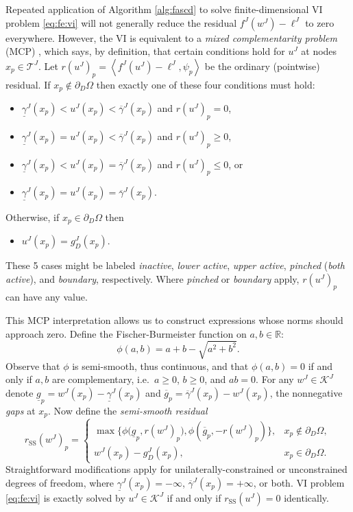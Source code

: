 \documentclass[review,hidelinks,onefignum,onetabnum,final]{siamart220329}  %
\newcommand{\RR}{\mathbb{R}}
\newcommand{\cK}{\mathcal{K}}
\newcommand{\ip}[2]{\left<#1,#2\right>}
\newcommand{\rSS}{r_{\text{SS}}}
\begin{document}
Repeated application of Algorithm \ref{alg:fascd} to solve finite-dimensional VI problem \eqref{eq:fe:vi} will not generally reduce the residual $f^J(w^J) - \ell^J$ to zero everywhere.  However, the VI is equivalent to a \emph{mixed complementarity problem} (MCP) \cite{FacchineiPang2003}, which says, by definition, that certain conditions hold for $u^J$ at nodes $x_p \in \mathcal{T}^J$.  Let $r(u^J)_p = \ip{f^J(u^J)-\ell^J}{\psi_p}$ be the ordinary (pointwise) residual.  If $x_p \notin \partial_D\Omega$ then exactly one of these four conditions must hold:
\begin{itemize}
\item $\underline{\gamma}^J(x_p)<u^J(x_p)<\overline{\gamma}^J(x_p)$ and $r(u^J)_p = 0$,
\item $\underline{\gamma}^J(x_p)=u^J(x_p)<\overline{\gamma}^J(x_p)$ and $r(u^J)_p \ge 0$,
\item $\underline{\gamma}^J(x_p)<u^J(x_p)=\overline{\gamma}^J(x_p)$ and $r(u^J)_p \le 0$, or
\item $\underline{\gamma}^J(x_p)=u^J(x_p)=\overline{\gamma}^J(x_p)$.
\end{itemize}
Otherwise, if $x_p \in \partial_D\Omega$ then
\begin{itemize}
\item $u^J(x_p)=g_D^J(x_p)$.
\end{itemize}
These 5 cases might be labeled \emph{inactive}, \emph{lower active}, \emph{upper active}, \emph{pinched} (\emph{both active}), and \emph{boundary}, respectively.  Where \emph{pinched} or \emph{boundary} apply, $r(u^J)_p$ can have any value.

This MCP interpretation allows us to construct expressions whose norms should approach zero.  Define the Fischer-Burmeister function \cite{BensonMunson2006,Ulbrich2011} on $a,b\in\RR$:
\begin{equation}
\phi(a,b) = a + b - \sqrt{a^2 + b^2}. \label{eq:phiFB}
\end{equation}
Observe that $\phi$ is semi-smooth, thus continuous, and that $\phi(a,b)=0$ if and only if $a,b$ are complementary, i.e.~$a\ge 0$, $b\ge 0$, and $ab=0$.  For any $w^J\in \mathcal{K}^J$ denote $\underline{g}_p = w^J(x_p) - \underline{\gamma}^J(x_p)$ and $\overline{g}_p = \overline{\gamma}^J(x_p) - w^J(x_p)$, the nonnegative \emph{gaps} at $x_p$.  Now define the \emph{semi-smooth residual}
\begin{equation}
\rSS(w^J)_p = \begin{cases}
\max\big\{\phi\big(\underline{g}_p, r(w^J)_p\big), \phi\left(\overline{g}_p, -r(w^J)_p\right)\big\}, & x_p \notin \partial_D\Omega, \\
w^J(x_p) - g_D^J(x_p), & x_p \in \partial_D\Omega.
\end{cases} \label{eq:rSS}
\end{equation}
Straightforward modifications apply for unilaterally-constrained or unconstrained degrees of freedom, where $\underline{\gamma}^J(x_p) = -\infty$, $\overline{\gamma}^J(x_p) = +\infty$, or both.  VI problem \eqref{eq:fe:vi} is exactly solved by $u^J\in\cK^J$ if and only if $\rSS(u^J)=0$ identically.
\end{document}
